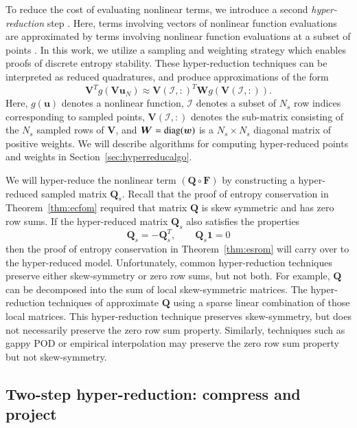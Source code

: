 \documentclass[preprint,10pt]{elsarticle}
\theoremstyle{definition}
\theoremstyle{lemma}
\theoremstyle{theorem}
\theoremstyle{assumption}
\newcommand{\LRp}[1]{\left( #1 \right)}
\begin{document}
To reduce the cost of evaluating nonlinear terms, we introduce a second \textit{hyper-reduction} step \cite{ryckelynck2009hyper}.  Here, terms involving vectors of nonlinear function evaluations are approximated by terms involving nonlinear function evaluations at a subset of points \cite{barrault2004empirical, bui2004aerodynamic, chaturantabut2010nonlinear, farhat2015structure, drmac2016new, hernandez2017dimensional, yano2019lp}.  In this work, we utilize a sampling and weighting strategy \cite{farhat2015structure, hernandez2017dimensional, yano2019lp} which enables proofs of discrete entropy stability.  These hyper-reduction techniques can be interpreted as reduced quadratures, and produce approximations of the form
\[
\bm{V}^Tg(\bm{V}\bm{u}_N) \approx \bm{V}\LRp{\mathcal{I},:}^T \bm{W} g\LRp{\bm{V}\LRp{\mathcal{I},:}}.
\]
Here, $g(\bm{u})$ denotes a nonlinear function, $\mathcal{I}$ denotes a subset of $N_s$ row indices corresponding to sampled points, $\bm{V}\LRp{\mathcal{I},:}$ denotes the sub-matrix consisting of the $N_s$ sampled rows of $\bm{V}$, and $\bm{W} = {\rm diag}(\bm{w})$ is a $N_s\times N_s$ diagonal matrix of positive weights.  We will describe algorithms for computing hyper-reduced points and weights in Section~\ref{sec:hyperreducalgo}.

We will hyper-reduce the nonlinear term $\LRp{\bm{Q}\circ \bm{F}}$ by constructing a hyper-reduced sampled matrix $\bm{Q}_s$.  Recall that the proof of entropy conservation in Theorem~\ref{thm:ecfom} required that matrix $\bm{Q}$ is skew symmetric and has zero row sums.  If the hyper-reduced matrix $\bm{Q}_s$ also satisfies the properties
\[
\bm{Q}_s = -\bm{Q}_s^T, \qquad \bm{Q}_s\bm{1} = 0
\]
then the proof of entropy conservation in Theorem~\ref{thm:esrom} will carry over to the hyper-reduced model.  Unfortunately, common hyper-reduction techniques preserve either skew-symmetry or zero row sums, but not both.  For example, $\bm{Q}$ can be decomposed into the sum of local skew-symmetric matrices.  The hyper-reduction techniques of \cite{farhat2015structure, yano2019discontinuous} approximate $\bm{Q}$ using a sparse linear combination of those local matrices.  This hyper-reduction technique preserves skew-symmetry, but does not necessarily preserve the zero row sum property.  Similarly, techniques such as gappy POD or empirical interpolation \cite{everson1995karhunen, barrault2004empirical, chaturantabut2010nonlinear} may preserve the zero row sum property but not skew-symmetry.  

\subsection{Two-step hyper-reduction: compress and project}
\end{document}

